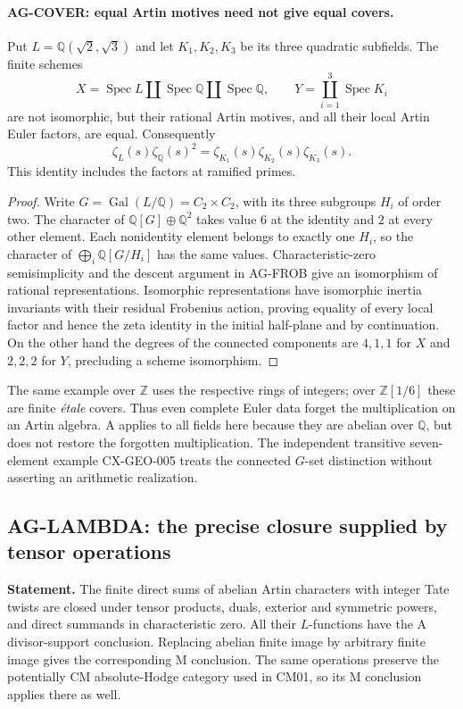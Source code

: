 \paragraph{AG-COVER: equal Artin motives need not give equal covers.}
Put $L=\mathbb Q(\sqrt2,\sqrt3)$ and let $K_1,K_2,K_3$ be its three
quadratic subfields. The finite schemes
\[
 X=\operatorname{Spec}L\amalg\operatorname{Spec}\mathbb Q
       \amalg\operatorname{Spec}\mathbb Q,
 \qquad
 Y=\coprod_{i=1}^3\operatorname{Spec}K_i
\]
are not isomorphic, but their rational Artin motives, and all their local
Artin Euler factors, are equal. Consequently
\[
 \zeta_L(s)\zeta_{\mathbb Q}(s)^2
       =\zeta_{K_1}(s)\zeta_{K_2}(s)\zeta_{K_3}(s).
\]
This identity includes the factors at ramified primes.

\begin{proof}
Write $G=\operatorname{Gal}(L/\mathbb Q)=C_2\times C_2$, with its three
subgroups $H_i$ of order two. The character of
$\mathbb Q[G]\oplus\mathbb Q^2$ takes value $6$ at the identity and
$2$ at every other element. Each nonidentity element belongs to exactly
one $H_i$, so the character of $\bigoplus_i\mathbb Q[G/H_i]$ has the
same values. Characteristic-zero semisimplicity and the descent argument
in AG-FROB give an isomorphism of rational representations. Isomorphic
representations have isomorphic inertia invariants with their residual
Frobenius action, proving equality of every local factor and hence the
zeta identity in the initial half-plane and by continuation. On the other
hand the degrees of the connected components are $4,1,1$ for $X$ and
$2,2,2$ for $Y$, precluding a scheme isomorphism.
\end{proof}

The same example over $\mathbb Z$ uses the respective rings of integers;
over $\mathbb Z[1/6]$ these are finite \emph{\'etale} covers. Thus even
complete Euler data forget the multiplication on an Artin algebra. A
applies to all fields here because they are abelian over $\mathbb Q$,
but does not restore the forgotten multiplication. The independent
transitive seven-element example CX-GEO-005 treats the connected
$G$-set distinction without asserting an arithmetic realization.

\subsection{AG-LAMBDA: the precise closure supplied by tensor operations}
\label{ag:lambda}

\textbf{Statement.} The finite direct sums of abelian Artin characters with
integer Tate twists are closed under tensor products, duals, exterior and
symmetric powers, and direct summands in characteristic zero. All their
$L$-functions have the A divisor-support conclusion. Replacing abelian
finite image by arbitrary finite image gives the corresponding M conclusion.
The same operations preserve the potentially CM absolute-Hodge category
used in CM01, so its M conclusion applies there as well.

